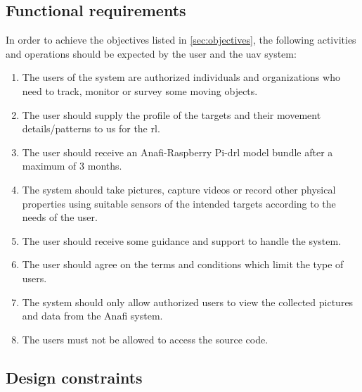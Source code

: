 \documentclass[../main.tex]{subfiles}
\begin{document}
\subsection{Functional requirements}

In order to achieve the objectives listed
in \cref{sec:objectives}, the following activities 
and operations should be expected by the user 
and the \gls{uav} system:

\begin{enumerate}
    \item The users of the system are authorized
        individuals and organizations who
        need to track, monitor or survey
        some moving objects.
    \item The user should supply the 
        profile of the targets 
        and their movement details/patterns
        to us for the \gls{rl}.
    \item The user should receive 
        an Anafi-Raspberry Pi-\gls{drl} 
        model bundle after a maximum of 3 months.
    \item The system should take pictures, capture videos
        or record other physical properties using
        suitable sensors of the intended
        targets according to the needs
        of the user.
    \item The user should receive some 
        guidance and support 
        to handle the system.
    \item The user should agree on 
        the terms and conditions 
        which limit the type of users.
    \item The system should only allow 
        authorized users 
        to view the collected pictures and 
        data from the Anafi system.
    \item The users must not be allowed to access 
        the source code.
\end{enumerate}

\subsection{Design constraints}
\end{document}
